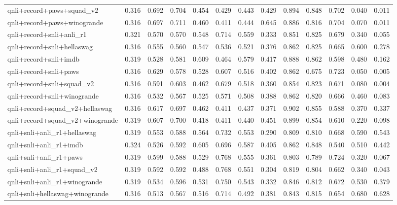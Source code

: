 \begin{table}[t]
\begin{tabular}{lrrrrrrrrrrrr}
    qnli+record+paws+squad\_v2 & 0.316 & 0.692 & 0.704 & 0.454 & 0.429 & 0.443 & 0.429 & 0.894 & 0.848 & 0.702 & 0.040 & 0.011 \\
    qnli+record+paws+winogrande & 0.316 & 0.697 & 0.711 & 0.460 & 0.411 & 0.444 & 0.645 & 0.886 & 0.816 & 0.704 & 0.070 & 0.011 \\
    qnli+record+snli+anli\_r1 & 0.321 & 0.570 & 0.570 & 0.548 & 0.714 & 0.559 & 0.333 & 0.851 & 0.825 & 0.679 & 0.340 & 0.055 \\
    qnli+record+snli+hellaswag & 0.316 & 0.555 & 0.560 & 0.547 & 0.536 & 0.521 & 0.376 & 0.862 & 0.825 & 0.665 & 0.600 & 0.278 \\
    qnli+record+snli+imdb & 0.319 & 0.528 & 0.581 & 0.609 & 0.464 & 0.579 & 0.417 & 0.888 & 0.862 & 0.598 & 0.480 & 0.162 \\
    qnli+record+snli+paws & 0.316 & 0.629 & 0.578 & 0.528 & 0.607 & 0.516 & 0.402 & 0.862 & 0.675 & 0.723 & 0.050 & 0.005 \\
    qnli+record+snli+squad\_v2 & 0.316 & 0.591 & 0.603 & 0.462 & 0.679 & 0.518 & 0.360 & 0.854 & 0.823 & 0.671 & 0.080 & 0.004 \\
    qnli+record+snli+winogrande & 0.316 & 0.532 & 0.567 & 0.525 & 0.571 & 0.508 & 0.388 & 0.862 & 0.820 & 0.666 & 0.460 & 0.083 \\
    qnli+record+squad\_v2+hellaswag & 0.316 & 0.617 & 0.697 & 0.462 & 0.411 & 0.437 & 0.371 & 0.902 & 0.855 & 0.588 & 0.370 & 0.337 \\
    qnli+record+squad\_v2+winogrande & 0.319 & 0.607 & 0.700 & 0.418 & 0.411 & 0.440 & 0.451 & 0.899 & 0.854 & 0.610 & 0.220 & 0.098 \\
    qnli+snli+anli\_r1+hellaswag & 0.319 & 0.553 & 0.588 & 0.564 & 0.732 & 0.553 & 0.290 & 0.809 & 0.810 & 0.668 & 0.590 & 0.543 \\
    qnli+snli+anli\_r1+imdb & 0.324 & 0.526 & 0.592 & 0.605 & 0.696 & 0.587 & 0.405 & 0.862 & 0.848 & 0.540 & 0.510 & 0.442 \\
    qnli+snli+anli\_r1+paws & 0.319 & 0.599 & 0.588 & 0.529 & 0.768 & 0.555 & 0.361 & 0.803 & 0.789 & 0.724 & 0.320 & 0.067 \\
    qnli+snli+anli\_r1+squad\_v2 & 0.319 & 0.592 & 0.592 & 0.488 & 0.768 & 0.551 & 0.304 & 0.819 & 0.804 & 0.662 & 0.340 & 0.043 \\
    qnli+snli+anli\_r1+winogrande & 0.319 & 0.534 & 0.596 & 0.531 & 0.750 & 0.543 & 0.332 & 0.846 & 0.812 & 0.672 & 0.530 & 0.379 \\
    qnli+snli+hellaswag+winogrande & 0.316 & 0.513 & 0.567 & 0.516 & 0.714 & 0.492 & 0.381 & 0.843 & 0.815 & 0.654 & 0.680 & 0.628 \\

\end{tabular}
\end{table}
